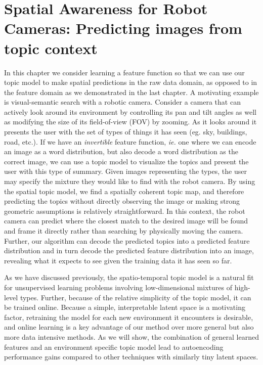 
\chapter{Spatial Awareness for Robot Cameras: Predicting images from topic context} \label{ch:spatial-prediction}

In this chapter we consider learning a feature function so that we can use our topic model to make spatial predictions in the raw data domain, as opposed to in the feature domain as we demonstrated in the last chapter. A motivating example is visual-semantic search with a robotic camera. Consider a camera that can actively look around its environment by controlling its pan and tilt angles as well as modifying the size of its field-of-view (FOV) by zooming. As it looks around it presents the user with the set of types of things it has seen (eg. sky, buildings, road, etc.). If we have an \emph{invertible} feature function, \emph{ie.} one where we can encode an image as a word distribution, but also decode a word distribution as the correct image, we can use a topic model to visualize the topics and present the user with this type of summary. Given images representing the types, the user may specify the mixture they would like to find with the robot camera. By using the spatial topic model, we find a spatially coherent topic map, and therefore predicting the topics without directly observing the image or making strong geometric assumptions is relatively straightforward. In this context, the robot camera can predict where the closest match to the desired image will be found and frame it directly rather than searching by physically moving the camera. Further, our algorithm can decode the predicted topics into a predicted feature distribution and in turn decode the predicted feature distribution into an image, revealing what it expects to see given the training data it has seen so far.

As we have discussed previously, the spatio-temporal topic model is a natural fit for unsupervised learning problems involving low-dimensional mixtures of high-level types. Further, because of the relative simplicity of the topic model, it can be trained online. Because a simple, interpretable latent space is a motivating factor, retraining the model for each new environment it encounters is desirable, and online learning is a key advantage of our method over more general but also more data intensive methods. As we will show, the combination of general learned features and an environment specific topic model lead to autoencoding performance gains compared to other techniques with similarly tiny latent spaces.

